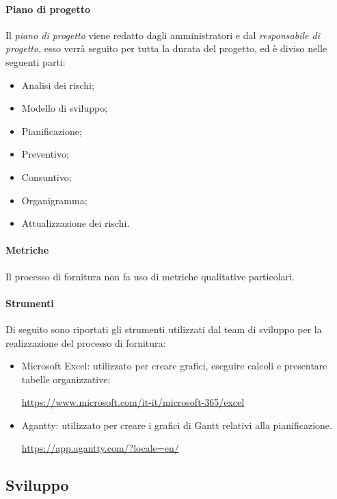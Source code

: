 \paragraph{Piano di progetto}\label{paragraph: PdP_fornitura}
Il \textit{piano di progetto} viene redatto dagli amministratori e dal \textit{responsabile di progetto}, esso verrà seguito per tutta la durata del progetto, ed è diviso nelle seguenti parti:
\begin{itemize}
    \item Analisi dei rischi;
    \item Modello di sviluppo;
    \item Pianificazione;
    \item Preventivo;
    \item Consuntivo;
    \item Organigramma;
    \item Attualizzazione dei rischi.
\end{itemize} 
\paragraph{Metriche}\label{paragraph: metriche_fornitura}
Il processo di fornitura non fa uso di metriche qualitative particolari.
\paragraph{Strumenti}\label{paragraph: strumenti_fornitura}
Di seguito sono riportati gli strumenti utilizzati dal team di sviluppo per la realizzazione del processo di fornitura:
\begin{itemize}
    \item Microsoft Excel: utilizzato per creare grafici, eseguire calcoli e presentare tabelle organizzative; 
    \begin{center}
        \url{https://www.microsoft.com/it-it/microsoft-365/excel}
    \end{center}
    \item Agantty: utilizzato per creare i grafici di Gantt relativi alla pianificazione. 
    \begin{center}
        \url{https://app.agantty.com/?locale=en/}
    \end{center}
\end{itemize}

\pagebreak

\subsection{Sviluppo} \label{subsection:Sviluppo}
